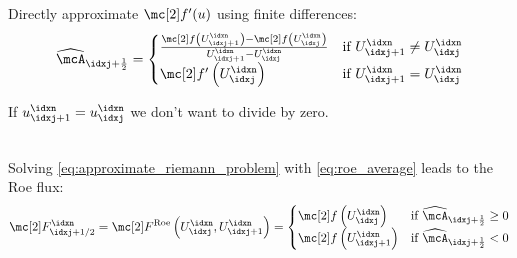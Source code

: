 \begin{defnbox}\nospacing
    \begin{defn}\label{defn:roe_average}
        Directly approximate $\flux'(u)$ using finite differences:
       \begin{align}
         \widehat{\mcA}_{\idxj+\frac{1}{2}}=
         \begin{cases}
             \frac{\flux\left(U^{\idxn}_{\idxj+1}\right)-\flux\left(U^{\idxn}_{\idxj}\right)}{U^{\idxn}_{\idxj+1}-U^{\idxn}_{\idxj}}&
             \text{if }U^{\idxn}_{\idxj+1}\neq U^{\idxn}_{\idxj} \\
             \flux'\left(U^{\idxn}_{\idxj}\right)&\text{if }U^{\idxn}_{\idxj+1}=U^{\idxn}_{\idxj}
         \end{cases}\label{eq:roe_average}
       \end{align}
    \end{defn}
\end{defnbox}
\begin{explanationbox}\nospacing
    \begin{explanation}
        If $u^{\idxn}_{\idxj+1}=u^{\idxn}_{\idxj}$ we don't want to divide by zero.
    \end{explanation}
\end{explanationbox}
\begin{defnbox}\nospacing
    \begin{defn}\label{defn:roe_flux}\leavevmode\\
        Solving \cref{eq:approximate_riemann_problem} with \cref{eq:roe_average} leads to the Roe flux:
        \begin{align}
          \Flux_{\idxj+1/2}^{\idxn}=\Flux^{\text{Roe}}\left(U^{\idxn}_{\idxj},U^{\idxn}_{\idxj+1}\right)=
          \begin{cases}
              \flux\left(U_{\idxj}^{\idxn}\right)&\text{if }\widehat{\mcA}_{\idxj+\frac{1}{2}}\geq0 \\
              \flux\left(U_{\idxj+1}^{\idxn}\right)&\text{if }\widehat{\mcA}_{\idxj+\frac{1}{2}}<0 \\
          \end{cases}
        \end{align}
    \end{defn}
\end{defnbox}

